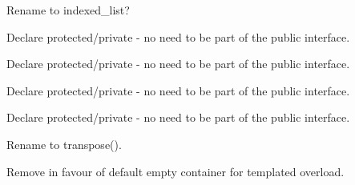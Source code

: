 
\begin{DoxyRefList}
\item[Class \mbox{\hyperlink{classstd_1_1indexer}{std\+::indexer\texorpdfstring{$<$}{<} Container, T, Locked \texorpdfstring{$>$}{>}}} ]\label{todo__todo000001}%
%
Rename to indexed\+\_\+list?  
\item[Member \mbox{\hyperlink{classstd_1_1matrix_ad9f43ecc5e09e5f805c853f1cca181c6}{std\+::matrix\texorpdfstring{$<$}{<} T \texorpdfstring{$>$}{>}\+::all\+ID}} () const]\label{todo__todo000002}%
%
Declare protected/private -\/ no need to be part of the public interface.  
\item[Member \mbox{\hyperlink{classstd_1_1matrix_a56a20c3e35d86b1c7c1f7fe55d85ea46}{std\+::matrix\texorpdfstring{$<$}{<} T \texorpdfstring{$>$}{>}\+::block\+ID}} (size\+\_\+t first\+\_\+row, size\+\_\+t last\+\_\+row, size\+\_\+t first\+\_\+col, size\+\_\+t last\+\_\+col) const]\label{todo__todo000006}%
%
Declare protected/private -\/ no need to be part of the public interface.  
\item[Member \mbox{\hyperlink{classstd_1_1matrix_a2e88ac44b8f1b05f0a6a3faa8710c167}{std\+::matrix\texorpdfstring{$<$}{<} T \texorpdfstring{$>$}{>}\+::col\+ID}} (size\+\_\+t col) const]\label{todo__todo000004}%
%
Declare protected/private -\/ no need to be part of the public interface.  
\item[Member \mbox{\hyperlink{classstd_1_1matrix_aa35d87e7bec5d7a99a7737fbf3c07257}{std\+::matrix\texorpdfstring{$<$}{<} T \texorpdfstring{$>$}{>}\+::diag\+ID}} () const]\label{todo__todo000005}%
%
Declare protected/private -\/ no need to be part of the public interface.  
\item[Member \mbox{\hyperlink{classstd_1_1matrix_ab5b6ea0fea5e289217c95fde16a6ef09}{std\+::matrix\texorpdfstring{$<$}{<} T \texorpdfstring{$>$}{>}\+::flip}} ()]\label{todo__todo000009}%
%
Rename to transpose().  
\item[Member \mbox{\hyperlink{classstd_1_1matrix_a04cbd04648b9e16481e901b855afdad6}{std\+::matrix\texorpdfstring{$<$}{<} T \texorpdfstring{$>$}{>}\+::push\+Col}} ()]\label{todo__todo000008}%
%
Remove in favour of default empty container for templated overload.  
\item[Member \mbox{\hyperlink{classstd_1_1matrix_a7cd8df5a31059daa3f86600d7106f9ce}{std\+::matrix\texorpdfstring{$<$}{<} T \texorpdfstring{$>$}{>}\+::push\+Row}} ()]\label{todo__todo000007}%

\end{DoxyRefList}
